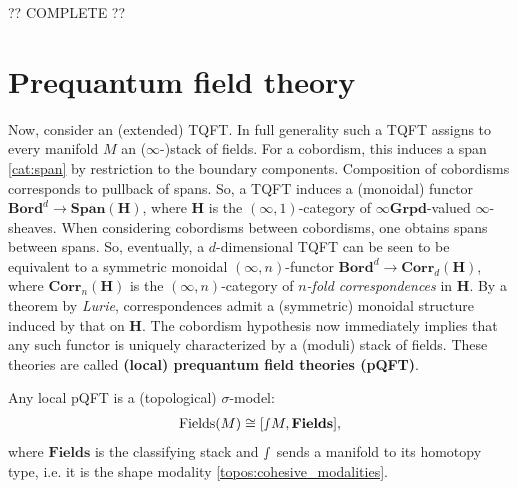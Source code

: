     ?? COMPLETE ??

\section{Prequantum field theory}

    Now, consider an (extended) TQFT. In full generality such a TQFT assigns to every manifold $M$ an ($\infty$-)stack of fields. For a cobordism, this induces a span \ref{cat:span} by restriction to the boundary components. Composition of cobordisms corresponds to pullback of spans. So, a TQFT induces a (monoidal) functor $\mathbf{Bord}^d\rightarrow\mathbf{Span}(\mathbf{H})$, where $\mathbf{H}$ is the $(\infty,1)$-category of $\infty\mathbf{Grpd}$-valued $\infty$-sheaves. When considering cobordisms between cobordisms, one obtains spans between spans. So, eventually, a $d$-dimensional TQFT can be seen to be equivalent to a symmetric monoidal $(\infty,n)$-functor $\mathbf{Bord}^d\rightarrow\mathbf{Corr}_d(\mathbf{H})$, where $\mathbf{Corr}_n(\mathbf{H})$ is the $(\infty,n)$-category of \textit{$n$-fold correspondences} in $\mathbf{H}$. By a theorem by \textit{Lurie}, correspondences admit a (symmetric) monoidal structure induced by that on $\mathbf{H}$. The cobordism hypothesis now immediately implies that any such functor is uniquely characterized by a (moduli) stack of fields. These theories are called \textbf{(local) prequantum field theories (pQFT)}.

    \begin{property}
        Any local pQFT is a (topological) $\sigma$-model:
        \begin{gather}
            \mathrm{Fields}(M)\cong[\smallint\!M,\mathbf{Fields}],
        \end{gather}
        where $\mathbf{Fields}$ is the classifying stack and $\smallint$ sends a manifold to its homotopy type, i.e. it is the shape modality \ref{topos:cohesive_modalities}.
    \end{property}

